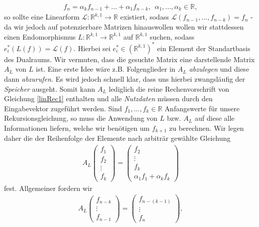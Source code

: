 \documentclass{article}
\theoremstyle{plain} %
\theoremstyle{definition} %
\begin{document}
\begin{align}
  f_{n} = \alpha_k f_{n-1} + ... + \alpha_1 f_{n-k}, ~~ \alpha_1,...,\alpha_k \in \mathbb{R}, \label{linRec1}
\end{align}
so sollte eine Linearform $\mathcal{L} : \mathbb{R}^{k,1} \to \mathbb{R}$ existiert, sodass $ \mathcal{L}(f_{n-1}, ..., f_{n-k}) = f_n$ - da wir jedoch auf potenzierbare Matrizen hinauswollen wollen wir stattdessen einen Endomorphismus $L : \mathbb{R}^{k,1} \to \mathbb{R}^{k,1}$ auf $\mathbb{R}^{k,1}$ suchen, sodass $e_i^*(L(f)) = \mathcal{L}(f)$. Hierbei sei $e_i^* \in (\mathbb{R}^{k,1})^*$ ein Element der Standartbasis des Dualraums. Wir vermuten, dass die gesuchte Matrix eine darstellende Matrix $A_L$ von $L$ ist. Eine erste Idee wäre z.B. Folgenglieder in $A_L$ \emph{abzulegen} und diese dann \emph{abzurufen}. Es wird jedoch schnell klar, dass uns hierbei zwangsläufig der \emph{Speicher} ausgeht. Somit kann $A_L$ lediglich die reine Rechenvorschrift von Gleichung \ref{linRec1} enthalten und alle \emph{Nutzdaten} müssen durch den Eingabevektor zugeführt werden. Sind $f_1,...,f_k \in \mathbb{R}$ Anfangswerte für unsere Rekursionsgleichung, so muss die Anwendung von $L$ bzw. $A_L$ auf diese alle Informationen liefern, welche wir benötigen um $f_{k+1}$ zu berechnen. Wir legen daher die der Reihenfolge der Elemente nach arbiträr gewählte Gleichung
\begin{align}
  A_L \begin{pmatrix}
    f_1 \\ f_2 \\ \vdots \\ f_k
  \end{pmatrix} = \begin{pmatrix}
    f_2 \\ \vdots \\ f_k \\ \alpha_1 f_1 + \alpha_k f_k
  \end{pmatrix} \label{linRec2}
\end{align}
fest. Allgemeiner fordern wir
\begin{align*}
  A_L \begin{pmatrix}
    f_{n-k} \\ \vdots \\ f_{n-1}
  \end{pmatrix} = \begin{pmatrix}
    f_{n-(k-1)} \\ \vdots \\ f_n
  \end{pmatrix},
\end{align*}
\end{document}
